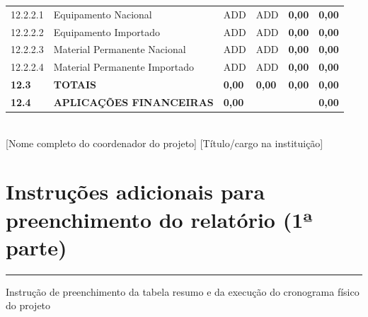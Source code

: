 \documentclass[a4paper,12pt]{article}
\begin{document}
\begin{table}[h]
{\begin{tabular}{|l|l|l|l|l|l|}
    12.2.2.1 & 
    Equipamento Nacional & 
    ADD & 
    ADD &
    \textbf{0,00} &
    \textbf{0,00} \\ 
       
    \rowcolor{Gainsboro!60}
    12.2.2.2 & 
    Equipamento Importado & 
    ADD & 
    ADD &
    \textbf{0,00} &
    \textbf{0,00} \\ 

    12.2.2.3 & 
    Material Permanente Nacional & 
    ADD & 
    ADD &
    \textbf{0,00} &
    \textbf{0,00} \\ 

    \rowcolor{Gainsboro!60}
    12.2.2.4 & 
    Material Permanente Importado & 
    ADD & 
    ADD &
    \textbf{0,00} &
    \textbf{0,00} \\ \hline

    \rowcolor{blue!40} \textbf{12.3} & 
    \textbf{TOTAIS} & 
    \textbf{0,00} & 
    \textbf{0,00} & 
    \textbf{0,00} & 
    \textbf{0,00} \\ \hline\hline

    \rowcolor{blue!40} \textbf{12.4} & 
    \textbf{APLICAÇÕES FINANCEIRAS} & 
    \multicolumn{3}{|l||}{\textbf{0,00}} & 
    \textbf{0,00} \\ \hline
    
\end{tabular}}
\end{table}


\vspace{1cm}


\vspace{1cm}
\underline{\hspace{10cm}} \\[1em] %
[Nome completo do coordenador do projeto] [Título/cargo na instituição]
\newpage

\section{Instruções adicionais para preenchimento do relatório (1ª parte)}
\vspace{-0.8cm} %
    \rule{\textwidth}{2pt} %

\raggedright Instrução de preenchimento da tabela resumo e da execução do cronograma físico do projeto
\end{document}
